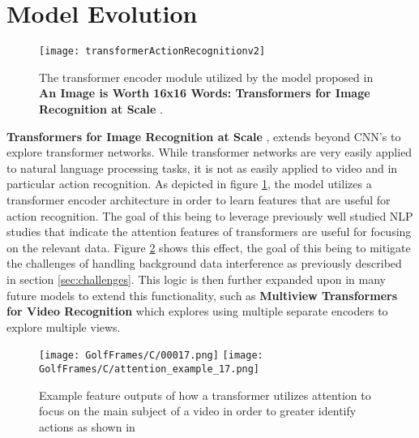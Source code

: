 \section{Model Evolution}

\begin{figure}[ht]
	\texttt{[image: transformerActionRecognitionv2]}
	\centering
	\caption{The transformer encoder module utilized by the model proposed in \textbf{An Image is Worth 16x16 Words: Transformers for Image Recognition at Scale} \cite{transformer_og}.}
	\label{fig:transformerActionRecognition}
\end{figure}

\textbf{Transformers for Image Recognition at Scale} \cite{transformer_og}, extends beyond CNN's to explore transformer networks. While transformer networks are very easily applied to natural language processing tasks, it is not as easily applied to video and in particular action recognition. As depicted in figure \ref{fig:transformerActionRecognition}, the model utilizes a transformer encoder architecture in order to learn features that are useful for action recognition. The goal of this being to leverage previously well studied NLP studies that indicate the attention features of transformers are useful for focusing on the relevant data. Figure \ref{fig:attentionExample} shows this effect, the goal of this being to mitigate the challenges of handling background data interference as previously described in section \ref{sec:challenges}. This logic is then further expanded upon in many future models to extend this functionality, such as \textbf{Multiview Transformers for Video Recognition} \cite{multiview_transformers} which explores using multiple separate encoders to explore multiple views.

\begin{figure}[ht]
	\texttt{[image: GolfFrames/C/00017.png]}
	\texttt{[image: GolfFrames/C/attention\_example\_17.png]}
	\centering
	\caption{Example feature outputs of how a transformer utilizes attention to focus on the main subject of a video in order to greater identify actions as shown in \cite{transformer_og}}
	\label{fig:attentionExample}
\end{figure}

